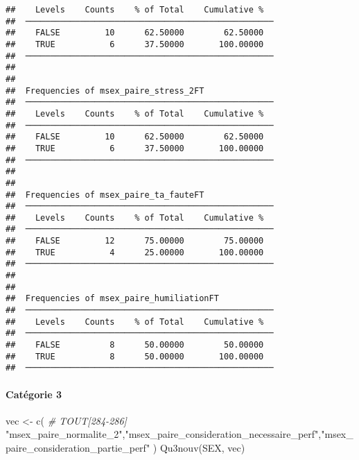 \documentclass[
]{article}
\newenvironment{Shaded}{\begin{snugshade}}{\end{snugshade}}
\newcommand{\CommentTok}[1]{\textcolor[rgb]{0.56,0.35,0.01}{\textit{#1}}}
\newcommand{\FunctionTok}[1]{\textcolor[rgb]{0.00,0.00,0.00}{#1}}
\newcommand{\NormalTok}[1]{#1}
\newcommand{\OtherTok}[1]{\textcolor[rgb]{0.56,0.35,0.01}{#1}}
\newcommand{\StringTok}[1]{\textcolor[rgb]{0.31,0.60,0.02}{#1}}
\begin{document}
\begin{verbatim}
##    Levels    Counts    % of Total    Cumulative %   
##  ────────────────────────────────────────────────── 
##    FALSE         10      62.50000        62.50000   
##    TRUE           6      37.50000       100.00000   
##  ────────────────────────────────────────────────── 
## 
## 
##  Frequencies of msex_paire_stress_2FT               
##  ────────────────────────────────────────────────── 
##    Levels    Counts    % of Total    Cumulative %   
##  ────────────────────────────────────────────────── 
##    FALSE         10      62.50000        62.50000   
##    TRUE           6      37.50000       100.00000   
##  ────────────────────────────────────────────────── 
## 
## 
##  Frequencies of msex_paire_ta_fauteFT               
##  ────────────────────────────────────────────────── 
##    Levels    Counts    % of Total    Cumulative %   
##  ────────────────────────────────────────────────── 
##    FALSE         12      75.00000        75.00000   
##    TRUE           4      25.00000       100.00000   
##  ────────────────────────────────────────────────── 
## 
## 
##  Frequencies of msex_paire_humiliationFT            
##  ────────────────────────────────────────────────── 
##    Levels    Counts    % of Total    Cumulative %   
##  ────────────────────────────────────────────────── 
##    FALSE          8      50.00000        50.00000   
##    TRUE           8      50.00000       100.00000   
##  ──────────────────────────────────────────────────
\end{verbatim}

\hypertarget{catuxe9gorie-3-3}{%
\paragraph{Catégorie 3}\label{catuxe9gorie-3-3}}

\begin{Shaded}
\begin{Highlighting}[]
\NormalTok{vec }\OtherTok{\textless{}{-}} \FunctionTok{c}\NormalTok{(   }\CommentTok{\# TOUT[284{-}286]}
  \StringTok{"msex\_paire\_normalite\_2"}\NormalTok{,}\StringTok{"msex\_paire\_consideration\_necessaire\_perf"}\NormalTok{,}\StringTok{"msex\_paire\_consideration\_partie\_perf"}
\NormalTok{)}
\FunctionTok{Qu3nouv}\NormalTok{(SEX, vec)}
\end{Highlighting}
\end{Shaded}
\end{document}

